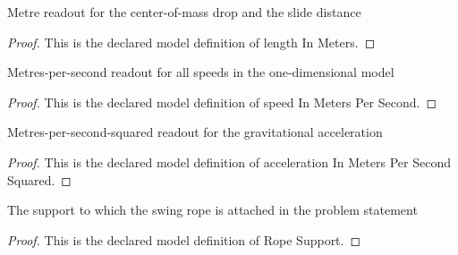 \begin{definition}
  \label{def:physics:phyx-mini-0766:phyxminiproblems-problemphyxmini0766-lengthinmeters}
  Metre readout for the center-of-mass drop and the slide distance
\end{definition}
\begin{proof}
  This is the declared model definition of length In Meters.
\end{proof}
\begin{definition}
  \label{def:physics:phyx-mini-0766:phyxminiproblems-problemphyxmini0766-speedinmeterspersecond}
  Metres-per-second readout for all speeds in the one-dimensional model
\end{definition}
\begin{proof}
  This is the declared model definition of speed In Meters Per Second.
\end{proof}
\begin{definition}
  \label{def:physics:phyx-mini-0766:phyxminiproblems-problemphyxmini0766-accelerationinmeterspersecondsquared}
  Metres-per-second-squared readout for the gravitational acceleration
\end{definition}
\begin{proof}
  This is the declared model definition of acceleration In Meters Per Second Squared.
\end{proof}
\begin{definition}
  \label{def:physics:phyx-mini-0766:phyxminiproblems-problemphyxmini0766-ropesupport}
  The support to which the swing rope is attached in the problem statement
\end{definition}
\begin{proof}
  This is the declared model definition of Rope Support.
\end{proof}
